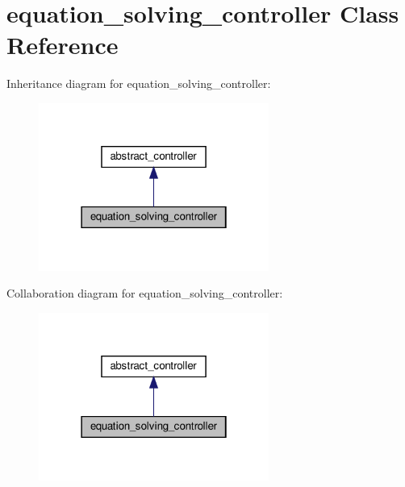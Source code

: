 \hypertarget{classequation__solving__controller}{}\section{equation\+\_\+solving\+\_\+controller Class Reference}
\label{classequation__solving__controller}


Inheritance diagram for equation\+\_\+solving\+\_\+controller\+:\nopagebreak
\begin{figure}[H]
\begin{center}
\leavevmode
\includegraphics[width=214pt]{classequation__solving__controller__inherit__graph}
\end{center}
\end{figure}


Collaboration diagram for equation\+\_\+solving\+\_\+controller\+:\nopagebreak
\begin{figure}[H]
\begin{center}
\leavevmode
\includegraphics[width=214pt]{classequation__solving__controller__coll__graph}
\end{center}
\end{figure}
